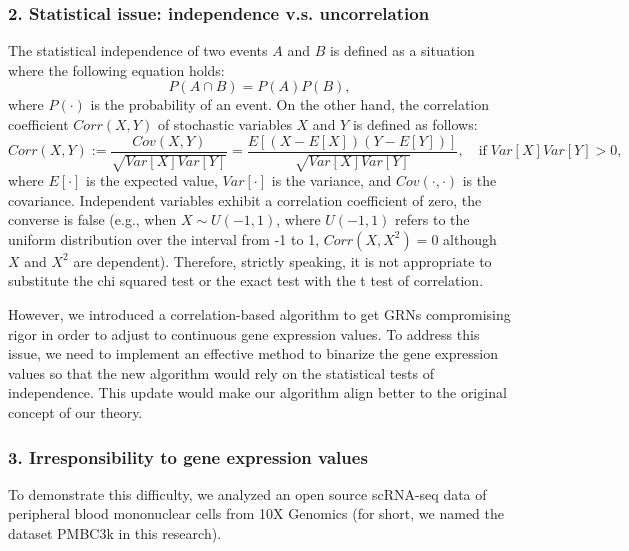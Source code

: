 \documentclass{article}
\begin{document}
\subsubsection*{2. Statistical issue: independence v.s. uncorrelation}
The statistical independence of two events $A$ and $B$ is defined as a situation where the following equation holds:
\begin{equation}\label{independence}
  P(A\cap B)=P(A)P(B),
\end{equation}
where $P(\cdot)$ is the probability of an event. On the other hand, the correlation coefficient $Corr(X, Y)$ of stochastic variables 
$X$ and $Y$ is defined as follows:
\begin{equation}\label{corr}
  Corr(X, Y):=\frac{Cov(X, Y)}{\sqrt{Var[X]Var[Y]}}=\frac{E[(X-E[X])(Y-E[Y])]}{\sqrt{Var[X]Var[Y]}},\quad \text{if}\; Var[X]Var[Y] > 0,
\end{equation}
where $E[\cdot]$ is the expected value, $Var[\cdot]$ is the variance, and $Cov(\cdot, \cdot)$ is the covariance. Independent variables 
exhibit a correlation coefficient of zero, the converse is false (e.g., when $X\sim U(-1, 1)$, where $U(-1, 1)$ refers to the uniform 
distribution over the interval from -1 to 1, $Corr(X, X^2)=0$ although $X$ and $X^2$ are dependent). Therefore, strictly 
speaking, it is not appropriate to substitute the chi squared test or the exact test with the t test of correlation.

However, we introduced a correlation-based algorithm to get GRNs compromising rigor in order to adjust to 
continuous gene expression values. To address this issue, we need to implement an effective method to binarize the 
gene expression values so that the new algorithm would rely on the statistical tests of independence. This update 
would make our algorithm align better to the original concept of our theory.

\subsubsection*{3. Irresponsibility to gene expression values}
To demonstrate this difficulty, we analyzed an open source scRNA-seq data of peripheral blood mononuclear 
cells from 10X Genomics (for short, we named the dataset PMBC3k in this research).
\end{document}
